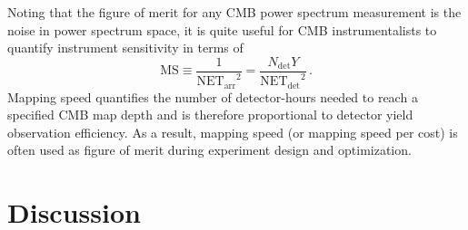 Noting that the figure of merit for any CMB power spectrum measurement is the noise in power spectrum space, it is quite useful for CMB instrumentalists to quantify instrument sensitivity in terms of 
\begin{equation}
    \mathrm{MS} \equiv \frac{1}{\mathrm{NET_{arr}}^{2}} = \frac{N_{\mathrm{det}} Y}{\mathrm{NET_{det}}^{2}} \, .
\end{equation}
Mapping speed quantifies the number of detector-hours needed to reach a specified CMB map depth and is therefore proportional to detector yield observation efficiency. As a result, mapping speed (or mapping speed per cost) is often used as figure of merit during experiment design and optimization.


\section{Discussion}
\label{sec:sensitivity_discussion}